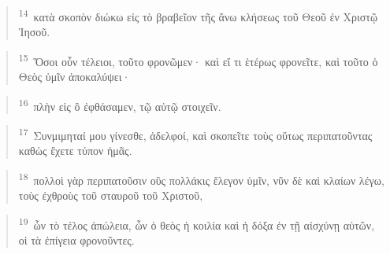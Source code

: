 \documentclass{article}
\newcommand{\currentverse}{1} %
\newcommand{\setcurrentverse}[1]{\renewcommand{\currentverse}{#1}}
\begin{document}
\begin{verse}

\setcurrentverse{14}

\setcounter{footnote}{0}

\textsuperscript{14}~κατὰ σκοπὸν διώκω εἰς τὸ βραβεῖον τῆς ἄνω κλήσεως τοῦ Θεοῦ ἐν Χριστῷ Ἰησοῦ.

\end{verse}

\begin{verse}

\setcurrentverse{15}

\setcounter{footnote}{0}

\textsuperscript{15}~Ὅσοι οὖν τέλειοι, τοῦτο φρονῶμεν· καὶ εἴ τι ἑτέρως φρονεῖτε, καὶ τοῦτο ὁ Θεὸς ὑμῖν ἀποκαλύψει·

\end{verse}

\begin{verse}

\setcurrentverse{16}

\setcounter{footnote}{0}

\textsuperscript{16}~πλὴν εἰς ὃ ἐφθάσαμεν, τῷ αὐτῷ στοιχεῖν.

\end{verse}

\begin{verse}

\setcurrentverse{17}

\setcounter{footnote}{0}

\textsuperscript{17}~Συνμιμηταί μου γίνεσθε, ἀδελφοί, καὶ σκοπεῖτε τοὺς οὕτως περιπατοῦντας καθὼς ἔχετε τύπον ἡμᾶς.

\end{verse}

\begin{verse}

\setcurrentverse{18}

\setcounter{footnote}{0}

\textsuperscript{18}~πολλοὶ γὰρ περιπατοῦσιν οὓς πολλάκις ἔλεγον ὑμῖν, νῦν δὲ καὶ κλαίων λέγω, τοὺς ἐχθροὺς τοῦ σταυροῦ τοῦ Χριστοῦ,

\end{verse}

\begin{verse}

\setcurrentverse{19}

\setcounter{footnote}{0}

\textsuperscript{19}~ὧν τὸ τέλος ἀπώλεια, ὧν ὁ θεὸς ἡ κοιλία καὶ ἡ δόξα ἐν τῇ αἰσχύνῃ αὐτῶν, οἱ τὰ ἐπίγεια φρονοῦντες.

\end{verse}
\end{document}
